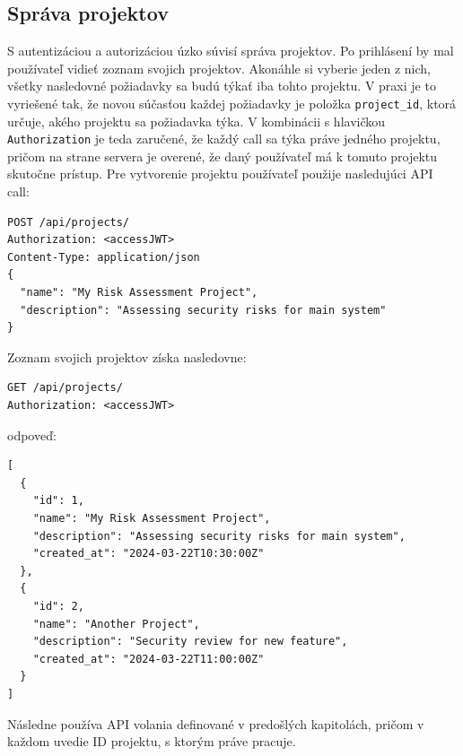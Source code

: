 \documentclass[11pt]{article}
\begin{document}
\subsection{Správa projektov}
S autentizáciou a autorizáciou úzko súvisí správa projektov. Po prihlásení by mal používateľ vidieť zoznam svojich projektov. Akonáhle si vyberie jeden z nich, všetky nasledovné požiadavky sa budú týkať iba tohto projektu. V praxi je to vyriešené tak, že novou súčasťou každej požiadavky je položka \texttt{project\_id}, ktorá určuje, akého projektu sa požiadavka týka. V kombinácii s hlavičkou \texttt{Authorization} je teda zaručené, že každý call sa týka práve jedného projektu, pričom na strane servera je overené, že daný používateľ má k tomuto projektu skutočne prístup.
Pre vytvorenie projektu používateľ použije nasledujúci API call:
\begin{verbatim}
POST /api/projects/
Authorization: <accessJWT>
Content-Type: application/json
{
  "name": "My Risk Assessment Project",
  "description": "Assessing security risks for main system"
}
\end{verbatim}
Zoznam svojich projektov získa nasledovne:
\begin{verbatim}
GET /api/projects/
Authorization: <accessJWT>
\end{verbatim}
odpoveď:
\begin{verbatim}
[
  {
    "id": 1,
    "name": "My Risk Assessment Project",
    "description": "Assessing security risks for main system",
    "created_at": "2024-03-22T10:30:00Z"
  },
  {
    "id": 2,
    "name": "Another Project",
    "description": "Security review for new feature",
    "created_at": "2024-03-22T11:00:00Z"
  }
]
\end{verbatim}
Následne používa API volania definované v predošlých kapitolách, pričom v každom uvedie ID projektu, s ktorým práve pracuje.
\end{document}
